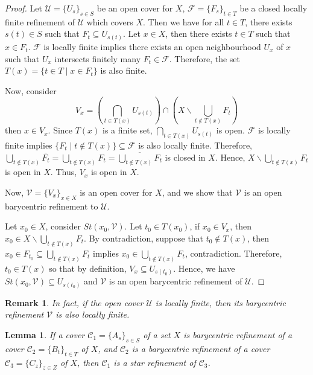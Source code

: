 \documentclass[12pt,oneside,english]{amsbook}
\numberwithin{equation}{section} %
\numberwithin{figure}{section} %
\theoremstyle{plain}
\numberwithin{section}{chapter}
\theoremstyle{plain}
\newtheorem{lem}[thm]{Lemma}
\newtheorem{remark}[thm]{Remark}
\begin{document}
\begin{proof}
  Let $\mathcal{U} = \{U_{s}\}_{s \in S}$ be an open cover for $X$, $\mathcal{F} = \{F_{s}\}_{t \in T}$ be a closed locally finite refinement of $\mathcal{U}$ which covers $X$. Then we have for all $t \in T$, there exists $s(t) \in S$ such that $F_{t} \subseteq U_{s(t)}$. Let $x \in X$, then there exists $t \in T$ such that $x \in F_{t}$. $\mathcal{F}$ is locally finite implies there exists an open neighbourhood $U_{x}$ of $x$ such that $U_{x}$ intersects finitely many $F_{t} \in \mathcal{F}$. Therefore, the set $T(x) = \{ t \in T \; | \; x \in F_{t} \}$ is also finite.

  Now, consider $$V_{x} = (\bigcap_{t \in T(x)} U_{s(t)}) \cap (X \backslash \bigcup_{t \notin T(x)} F_{t})$$
  then $x \in V_{x}$. Since $T(x)$ is a finite set, $\bigcap_{t \in T(x)}U_{s(t)}$ is open. $\mathcal{F}$ is locally finite implies $\{F_{t} \; | \; t \notin T(x)\} \subseteq \mathcal{F}$ is also locally finite. Therefore, $\bigcup_{t \notin T(x)} \overline{F_{t}} = \bigcup_{t \notin T(x)} F_{t} = \overline{\bigcup_{t \notin T(x)}F_{t}}$ is closed in $X$. Hence, $X \backslash \bigcup_{t \notin T(x)}F_{t}$ is open in $X$. Thus, $V_{x}$ is open in $X$.

  Now, $\mathcal{V} = \{V_{x}\}_{x \in X}$ is an open cover for $X$, and we show that $\mathcal{V}$ is an open barycentric refinement to $\mathcal{U}$.

  Let $x_{0} \in X$, consider $St(x_{0},\mathcal{V})$. Let $t_{0} \in T(x_{0})$, if $x_{0} \in V_{x}$, then $x_{0} \in X \backslash \bigcup_{t \notin T(x)}F_{t}$. By contradiction, suppose that $t_{0} \notin T(x)$, then $x_0 \in F_{t_{0}} \subseteq \bigcup_{t \notin T(x)}F_{t}$ implies $x_{0} \in \bigcup_{t \notin T(x)}F_{t}$, contradiction. Therefore, $t_{0} \in T(x)$ so that by definition, $V_{x} \subseteq U_{s(t_{0})}$. Hence, we have $St(x_{0},\mathcal{V}) \subseteq U_{s(t_{0})}$ and $\mathcal{V}$ is an open barycentric refinement of $\mathcal{U}$.
\end{proof}

\begin{remark}
  In fact, if the open cover $\mathcal{U}$ is locally finite, then its barycentric refinement $\mathcal{V}$ is also locally finite.
\end{remark}

\begin{lem} \label{lem:paracompact:11}
  If a cover $\mathcal{C}_1 = \{A_{s}\}_{s \in S}$ of a set $X$ is barycentric refinement of a cover $\mathcal{C}_2 = \{B_{t}\}_{t \in T}$ of $X$, and $\mathcal{C}_2$ is a barycentric refinement of a cover $\mathcal{C}_3 = \{C_z\}_{z \in Z}$ of $X$, then $\mathcal{C}_1$ is a star refinement of $\mathcal{C}_3$. 
\end{lem}
\end{document}
